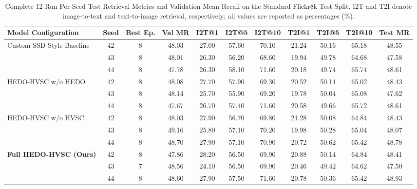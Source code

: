 \documentclass[journal]{IEEEtran}
\begin{document}
\begin{table}[!t]
\centering
\caption{Complete 12-Run Per-Seed Test Retrieval Metrics and Validation Mean Recall on the Standard Flickr8k Test Split. I2T and T2I denote image-to-text and text-to-image retrieval, respectively; all values are reported as percentages (\%).}
\label{tab:supp_per_seed_retrieval}
\small
\begin{tabular}{lcccccccccc}
\toprule
\textbf{Model Configuration} & \textbf{Seed} & \textbf{Best Ep.} & \textbf{Val MR} & \textbf{I2T@1} & \textbf{I2T@5} & \textbf{I2T@10} & \textbf{T2I@1} & \textbf{T2I@5} & \textbf{T2I@10} & \textbf{Test MR} \\
\midrule
\multirow{3}{*}{Custom SSD-Style Baseline} & 42 & 8 & 48.03 & 27.00 & 57.60 & 70.10 & 21.24 & 50.16 & 65.18 & 48.55 \\
 & 43 & 8 & 48.01 & 26.30 & 56.20 & 68.60 & 19.94 & 49.78 & 64.68 & 47.58 \\
 & 44 & 8 & 47.78 & 26.30 & 58.10 & 71.60 & 20.18 & 49.74 & 65.74 & 48.61 \\
\midrule
\multirow{3}{*}{HEDO-HVSC w/o HEDO} & 42 & 8 & 48.08 & 27.70 & 57.90 & 69.30 & 20.52 & 50.14 & 65.02 & 48.43 \\
 & 43 & 8 & 48.14 & 25.70 & 55.90 & 69.20 & 19.78 & 50.04 & 65.08 & 47.62 \\
 & 44 & 8 & 47.67 & 26.70 & 57.40 & 71.60 & 20.58 & 49.66 & 65.72 & 48.61 \\
\midrule
\multirow{3}{*}{HEDO-HVSC w/o HVSC} & 42 & 8 & 48.03 & 27.90 & 56.70 & 69.80 & 21.28 & 50.08 & 64.84 & 48.43 \\
 & 43 & 8 & 49.16 & 25.80 & 57.10 & 70.20 & 19.98 & 50.28 & 65.04 & 48.07 \\
 & 44 & 8 & 48.70 & 27.90 & 57.10 & 70.90 & 20.72 & 50.62 & 65.42 & 48.78 \\
\midrule
\multirow{3}{*}{\textbf{Full HEDO-HVSC (Ours)}} & 42 & 8 & 47.86 & 28.20 & 56.50 & 69.90 & 20.88 & 50.14 & 64.84 & 48.41 \\
 & 43 & 7 & 48.56 & 24.10 & 56.50 & 69.90 & 20.46 & 49.42 & 64.62 & 47.50 \\
 & 44 & 8 & 48.60 & 27.90 & 57.50 & 71.60 & 20.78 & 50.36 & 65.42 & 48.93 \\
\bottomrule
\end{tabular}
\end{table}
\end{document}
